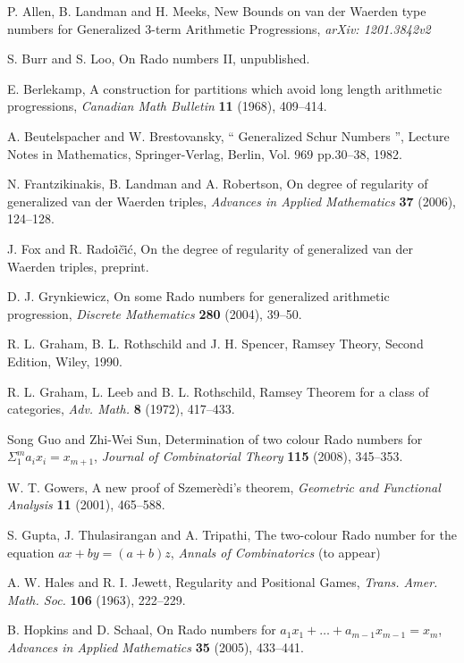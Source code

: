 \documentclass[12pt]{report}
\begin{document}
%
\begin{thebibliography}{99}


P. Allen, B. Landman and H. Meeks, New Bounds on van der Waerden type numbers for Generalized $3$-term Arithmetic Progressions, {\it arXiv: 1201.3842v2}


S. Burr and S. Loo, On Rado numbers II, unpublished.

E. Berlekamp, A construction for partitions which avoid long length arithmetic progressions, {\it Canadian Math Bulletin\/} {\bf 11} (1968), 409--414.


A. Beutelspacher and W. Brestovansky, `` Generalized Schur Numbers '', Lecture Notes in Mathematics, Springer-Verlag, Berlin, Vol. 969   pp.30--38, 1982. 

N. Frantzikinakis, B. Landman and A. Robertson, On degree of regularity of generalized van der Waerden triples, {\it Advances in Applied Mathematics\/} {\bf 37} (2006), 124--128.

J. Fox and R. Rado\. {i}\v {c}\. {i}\' {c}, On the degree of regularity of generalized van der Waerden triples, preprint.

D. J. Grynkiewicz, On some Rado numbers for generalized arithmetic progression, {\it Discrete Mathematics\/} {\bf 280} (2004), 39--50.

R. L. Graham, B. L. Rothschild and J. H. Spencer, Ramsey Theory, Second Edition, Wiley, 1990.

R. L. Graham, L. Leeb and B. L. Rothschild, Ramsey Theorem for a class of categories, {\it Adv. Math.\/} {\bf 8} (1972), 417--433.

Song Guo and Zhi-Wei Sun, Determination of two colour Rado numbers for $\Sigma_1^m a_ix_i=x_{m+1}$, {\it Journal of Combinatorial Theory\/} {\bf 115} (2008), 345--353.

W. T. Gowers, A new proof of Szemer\`{e}di's theorem, {\it Geometric and Functional Analysis\/} {\bf 11} (2001), 465--588.

S. Gupta, J. Thulasirangan and A. Tripathi, The two-colour Rado number for the equation $ax+by=(a+b)z$, {\it Annals of Combinatorics\/} (to appear)

A. W. Hales and R. I. Jewett, Regularity and Positional Games, {\it Trans. Amer. Math. Soc.\/} {\bf 106} (1963), 222--229.

B. Hopkins and D. Schaal, On Rado numbers for $a_1x_1+\ldots+a_{m-1}x_{m-1}=x_m$, {\it Advances in Applied Mathematics\/} {\bf35} (2005), 433--441.


\end{thebibliography}
\end{document}
